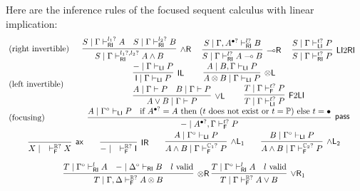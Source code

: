 \documentclass[submission,copyright,creativecommons]{eptcs}
\theoremstyle{definition}
\newcommand{\tl}{\otimes \mathsf{L}}
\newcommand{\tr}{\otimes \mathsf{R}}
\newcommand{\lright}{{\multimap}\mathsf{R}}
\newcommand{\pass}{\mathsf{pass}}
\newcommand{\unitl}{\mathsf{IL}}
\newcommand{\unitr}{\mathsf{IR}}
\newcommand{\andlone}{\land \mathsf{L}_{1}}
\newcommand{\andltwo}{\land \mathsf{L}_{2}}
\newcommand{\andr}{\land \mathsf{R}}
\newcommand{\orl}{\lor \mathsf{L}}
\newcommand{\orrone}{\lor \mathsf{R}_{1}}
\newcommand{\ax}{\mathsf{ax}}
\newcommand{\ot}{\otimes}
\newcommand{\lolli}{\multimap}
\newcommand{\I}{\mathsf{I}}
\newcommand{\RI}{\mathsf{RI}}
\newcommand{\LI}{\mathsf{LI}}
\newcommand{\F}{\mathsf{F}}
\newcommand{\tP}{\mathbb{P}}
\newcommand{\tCone}{\mathbb{C}_1}
\newcommand{\tCtwo}{\mathbb{C}_2}
\newcommand{\tE}{\mathbb{R}}
\newcommand{\proofbox}[1]{\begin{tabular}{l} #1 \end{tabular}}
\begin{document}
Here are the inference rules of the focused sequent calculus with linear implication:
\begin{equation}\label{eq:focus:impl}
  \!
  \begin{array}{lc}
    \text{(right invertible)} & %
    \proofbox{
      \infer[\andr]{S \mid \Gamma \vdash^{l_1?, l_2?}_{\RI} A \land B}{
        S \mid \Gamma \vdash^{l_1?}_{\RI} A
        &
        S \mid \Gamma \vdash^{l_2?}_{\RI} B
      }
    \quad
    \infer[\lright]{S \mid \Gamma \vdash^{l?}_{\RI} A \lolli B}{S \mid \Gamma , A^{\bullet ?} \vdash^{l?}_{\RI} B}
    \quad
    \infer[\LI 2 \RI]{S \mid \Gamma \vdash^{t?}_{\RI} P}{S \mid \Gamma \vdash^{t?}_{\LI} P}
    }
    \\[10pt]
    \text{(left invertible)} & %
    \proofbox{
      \infer[\unitl]{\I \mid \Gamma \vdash_{\LI} P}{{-} \mid \Gamma \vdash_{\LI} P}
    \qquad
    \infer[\tl]{A \ot B \mid \Gamma \vdash_{\LI} P}{A \mid B , \Gamma \vdash_{\LI} P}
    \\
    \infer[\orl]{A \lor B \mid \Gamma \vdash P}{
      A \mid \Gamma \vdash P
      &
      B \mid \Gamma \vdash P
    }
    \qquad
    \infer[\F 2 \LI]{T \mid \Gamma \vdash^{t?}_{\LI} P}{T \mid \Gamma \vdash^{t?}_{\F} P}
    }
    \\[10pt]
    \text{(focusing)} &    %
    \proofbox{
    \infer[\pass]{{-} \mid A^{\bullet ?} , \Gamma \vdash^{t?}_{\F} P }{
        A \mid \Gamma^{\circ} \vdash_{\LI} P
        &
        \text{if } A^{\bullet?} = A \text{ then } (t \text{ does not exist or } t = \tP) \text{ else } t = \bullet
    }
    }
    \\[10pt]
    \multicolumn{2}{c}{
    \infer[\ax]{X \mid \quad \vdash^{\tE?}_{\F} X}{}
    \qquad
    \infer[\unitr]{{-} \mid \quad \vdash^{\tE?}_{\F} \I}{}
    \qquad
    \infer[\andlone]{A \land B \mid \Gamma \vdash^{\tCone?}_{\F} P}{A \mid \Gamma^{\circ} \vdash_{\LI} P}
    \qquad
    \infer[\andltwo]{A \land B \mid \Gamma \vdash^{\tCtwo?}_{\F} P}{B \mid \Gamma^{\circ} \vdash_{\LI} P}
    }
    \\[10pt]
    \multicolumn{2}{c}{
    \infer[\tr]{T \mid \Gamma , \Delta \vdash^{\tE?}_{\F} A \ot B}{
      T \mid \Gamma^{\circ} \vdash^{l}_{\RI} A
      &
      {-} \mid \Delta^{\circ} \vdash_{\RI} B
      &
      l \ \text{valid}
    }
    \;
    \infer[\orrone]{T \mid \Gamma \vdash^{\tE?}_{\F} A \lor B}{
      T \mid \Gamma^{\circ} \vdash^{l}_{\RI} A
      &
      l \ \text{valid}
}}
\end{array}
\end{equation}
\end{document}
